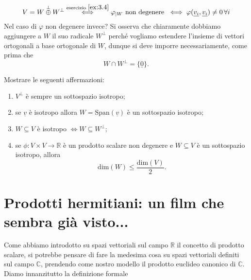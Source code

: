 $$
	V = W \overset{\perp}{\oplus} W^\perp \stackrel{\text{esercizio } \ref{ex:3.4}}{\iff} \varphi_{|W} \text{ non degenere } \iff \varphi(\underline{v_i}, \underline{v_i}) \neq 0 \, \forall i
$$
Nel caso di $\varphi$ non degenere invece? Si osserva che chiaramente dobbiamo aggiungere a $W$ il suo radicale $W^\perp$ perché vogliamo estendere l'insieme di vettori ortogonali a base ortogonale di $W$, dunque si deve imporre necessariamente, come prima che
$$
	W \cap W^\perp = \{ \underline{0} \}.
$$
\begin{exercise}
	Mostrare le seguenti affermazioni:
	\begin{enumerate}[label=\protect\circled{\arabic*}]
		\item $V^\perp$ è sempre un sottospazio isotropo;
		\item se $\underline{v}$ è isotropo allora $W = \text{Span}(\underline{v})$ è un sottospazio isotropo;
		\item $W \subseteq V$ è isotropo $\iff W \subseteq W^\perp$;
		\item se $\phi: V \times V \to \mathbb{R}$ è un prodotto scalare non degenere e $W \subseteq V$ è un sottospazio isotropo, allora
		$$
			\text{dim}(W) \leq \frac{\text{dim}(V)}{2}.
		$$
	\end{enumerate}
\end{exercise}
\section{Prodotti hermitiani: un film che sembra già visto...}

Come abbiamo introdotto su spazi vettoriali sul campo $\mathbb{R}$ il concetto di prodotto scalare, si potrebbe pensare di fare la medesima cosa su spazi vettoriali definiti sul campo $\mathbb{C}$,
prendendo come nostro modello il prodotto euclideo canonico di $\mathbb{C}$. Diamo innanzitutto la definizione formale

